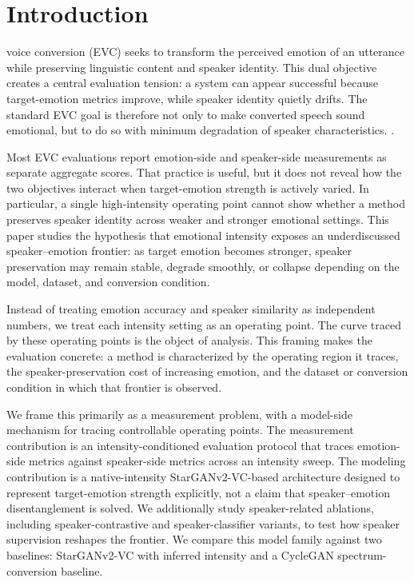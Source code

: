 \section{Introduction}
\label{sec:introduction}

 voice conversion (EVC) seeks to transform the perceived emotion of an utterance while preserving linguistic content and speaker identity.
This dual objective creates a central evaluation tension: a system can appear successful because target-emotion metrics improve, while speaker identity quietly drifts.
The standard EVC goal is therefore not only to make converted speech sound emotional, but to do so with minimum degradation of speaker characteristics. \cite{yang2022overview,zhou2022evctheoryesd}.

Most EVC evaluations report emotion-side and speaker-side measurements as separate aggregate scores.
That practice is useful, but it does not reveal how the two objectives interact when target-emotion strength is actively varied.
In particular, a single high-intensity operating point cannot show whether a method preserves speaker identity across weaker and stronger emotional settings.
This paper studies the hypothesis that emotional intensity exposes an underdiscussed speaker--emotion frontier: as target emotion becomes stronger, speaker preservation may remain stable, degrade smoothly, or collapse depending on the model, dataset, and conversion condition.

Instead of treating emotion accuracy and speaker similarity as independent numbers, we treat each intensity setting as an operating point.
The curve traced by these operating points is the object of analysis.
This framing makes the evaluation concrete: a method is characterized by the operating region it traces, the speaker-preservation cost of increasing emotion, and the dataset or conversion condition in which that frontier is observed.


We frame this primarily as a measurement problem, with a model-side mechanism for tracing controllable operating points.
The measurement contribution is an intensity-conditioned evaluation protocol that traces emotion-side metrics against speaker-side metrics across an intensity sweep.
The modeling contribution is a native-intensity StarGANv2-VC-based architecture designed to represent target-emotion strength explicitly, not a claim that speaker--emotion disentanglement is solved.
We additionally study speaker-related ablations, including speaker-contrastive and speaker-classifier variants, to test how speaker supervision reshapes the frontier.
We compare this model family against two baselines: StarGANv2-VC with inferred intensity and a CycleGAN spectrum-conversion baseline.

